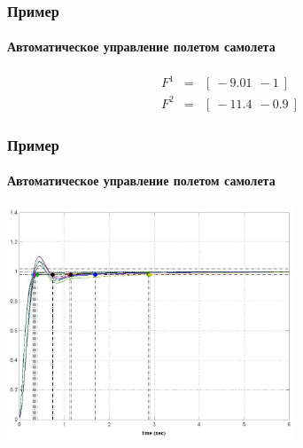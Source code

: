 \documentclass[ignorenonframetext,hyperref={pdftex,unicode},compress,handout]{beamer}
\newcommand{\br}{\vspace{12pt}}
\begin{document}
\begin{frame}
    \frametitle{Пример}
    \framesubtitle{Автоматическое управление полетом самолета}
    \begin{eqnarray*}
        F^1&=&\left[~-9.01~~-1~\right] \\
        F^2&=&\left[~-11.4~~-0.9~\right]
    \end{eqnarray*}
\end{frame}





\begin{frame}
    \frametitle{Пример}
    \framesubtitle{Автоматическое управление полетом самолета}
    \br
    \begin{center}
    \includegraphics[height=7cm]{shot.jpg}
    \end{center}
\end{frame}
\end{document}
